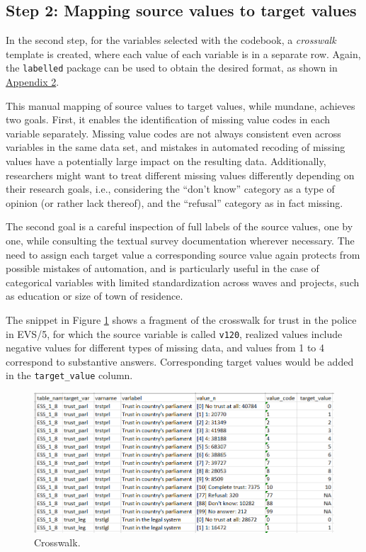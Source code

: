 \documentclass[12pt,]{article}
\begin{document}
\hypertarget{step-2-mapping-source-values-to-target-values}{%
\subsection{Step 2: Mapping source values to target values}\label{step-2-mapping-source-values-to-target-values}}

In the second step, for the variables selected with the codebook, a \emph{crosswalk} template is created, where each value of each variable is in a separate row. Again, the \texttt{labelled} package can be used to obtain the desired format, as shown in \protect\hyperlink{appendix2}{Appendix 2}.

This manual mapping of source values to target values, while mundane, achieves two goals. First, it enables the identification of missing value codes in each variable separately. Missing value codes are not always consistent even across variables in the same data set, and mistakes in automated recoding of missing values have a potentially large impact on the resulting data. Additionally, researchers might want to treat different missing values differently depending on their research goals, i.e., considering the ``don't know'' category as a type of opinion (or rather lack thereof), and the ``refusal'' category as in fact missing.

The second goal is a careful inspection of full labels of the source values, one by one, while consulting the textual survey documentation wherever necessary. The need to assign each target value a corresponding source value again protects from possible mistakes of automation, and is particularly useful in the case of categorical variables with limited standardization across waves and projects, such as education or size of town of residence.

The snippet in Figure \ref{fig:cwt} shows a fragment of the crosswalk for trust in the police in EVS/5, for which the source variable is called \texttt{v120}, realized values include negative values for different types of missing data, and values from 1 to 4 correspond to substantive answers. Corresponding target values would be added in the \texttt{target\_value} column.

\begin{figure}[H]
\includegraphics[width=465px]{../pictures/cwt_full} \caption{Crosswalk.}\label{fig:cwt}
\end{figure}
\end{document}

